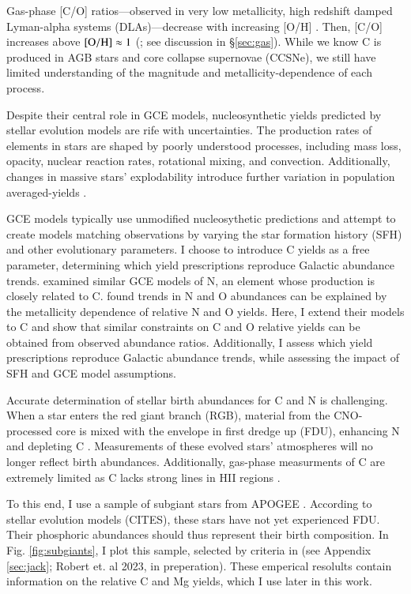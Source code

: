 \documentclass[12pt,oneside]{report}
\newcommand{\citealtjack}{Robert et. al 2023, in preperation}
\begin{document}
Gas-phase [C/O] ratios---observed in very low metallicity, high redshift damped Lyman-alpha systems (DLAs)---decrease with increasing [O/H] \citep{FN15, cooke+17}. Then, [C/O] increases above $\rm [O/H] \approx 1$ (\citealt{berg+19}; see discussion in \S\ref{sec:gas}).
While we know C is produced in AGB stars and core collapse supernovae (CCSNe), we still have limited understanding of the magnitude and metallicity-dependence of each process.


Despite their central role in GCE models, nucleosynthetic yields predicted by stellar evolution models are rife with uncertainties. The production rates of elements in stars are shaped by poorly understood processes, including mass loss, opacity, nuclear reaction rates, rotational mixing, and convection\citep{KL14,ventura+13, LC18}.
Additionally, changes in massive stars' explodability introduce further variation in population averaged-yields \citep{emily+21}.

GCE models typically use unmodified nucleosythetic predictions and attempt to create models matching observations by varying the star formation history (SFH) and other evolutionary parameters. I choose to introduce C yields as a free parameter, determining which yield prescriptions reproduce Galactic abundance trends.
\cite{james+22} examined similar GCE models of N, an element whose production is closely related to C. \cite{james+22} found trends in N and O abundances can be explained by the metallicity dependence of relative N and O yields. Here, I extend their models to C and show that similar constraints on C and O relative yields can be obtained from observed abundance ratios. Additionally, I assess which yield prescriptions reproduce Galactic abundance trends, while assessing the impact of SFH and GCE model assumptions.

Accurate determination of stellar birth abundances for C and N is challenging. When a star enters the red giant branch (RGB), material from the CNO-processed core is mixed with the envelope in first dredge up (FDU), enhancing N and depleting C \citep{iben67, fiorenzo+21,KL14}. Measurements of these evolved stars'  atmospheres will no longer reflect birth abundances.  Additionally, gas-phase measurments of C are extremely limited as C lacks strong lines in HII regions \citep{skillman+20}.

To this end, I use a sample of subgiant stars from APOGEE \citep{apogee17}. According to stellar evolution models (CITES), these stars have not yet experienced FDU. Their phosphoric abundances should thus represent their birth composition.  In Fig. \ref{fig:subgiants}, I plot this sample, selected by criteria in (see Appendix \ref{sec:jack}; \citealtjack). These emperical resolults contain information on the relative C and Mg yields, which I use later in this work.
\end{document}
